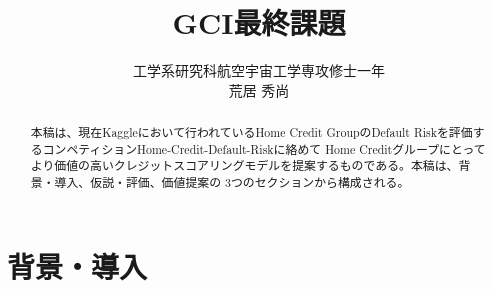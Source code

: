 \documentclass[a4paper,10pt]{jsarticle}
\title{GCI最終課題}
\author{工学系研究科航空宇宙工学専攻修士一年\\荒居 秀尚}
\begin{document}
\maketitle

\begin{abstract}
本稿は、現在Kaggleにおいて行われているHome Credit GroupのDefault Riskを評価するコンペティションHome-Credit-Default-Riskに絡めて
Home Creditグループにとってより価値の高いクレジットスコアリングモデルを提案するものである。本稿は、背景・導入、仮説・評価、価値提案の
3つのセクションから構成される。
\end{abstract}

\section{背景・導入}
\end{document}
